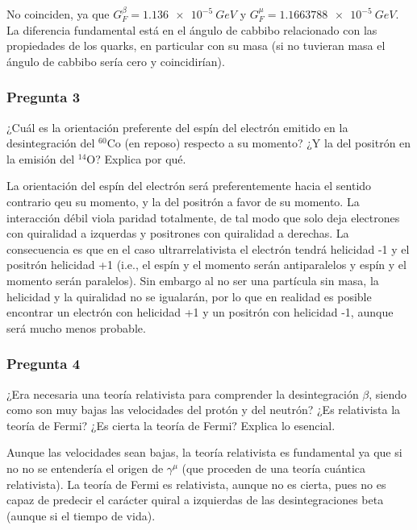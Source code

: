 No coinciden, ya que $G_F^\beta = \SI{1.136e-5}{GeV}$ y $G_F^\mu = \SI{1.1663788e-5}{GeV}$. La diferencia fundamental está en el ángulo de cabbibo relacionado con las propiedades de los quarks, en particular con su masa (si no tuvieran masa el ángulo de cabbibo sería cero y coincidirían).

\vspace*{2em}

\begin{Enunciado}
	\subsubsection*{Pregunta 3}

	¿Cuál es la orientación preferente del espín del electrón emitido en la desintegración del $^{60}$Co (en reposo) respecto a su momento? ¿Y la del positrón en la emisión del $^{14}$O? Explica por qué.

\end{Enunciado}

La orientación del espín del electrón será preferentemente hacia el sentido contrario qeu su momento, y la del positrón a favor de su momento. La interacción débil viola paridad totalmente, de tal modo que solo deja electrones con quiralidad a izquerdas y positrones con quiralidad a derechas. La consecuencia es que en el caso ultrarrelativista el electrón tendrá helicidad -1 y el positrón helicidad +1 (i.e., el espín y el momento serán antiparalelos y espín y el momento serán paralelos). Sin embargo al no ser una partícula sin masa, la helicidad y la quiralidad no se igualarán, por lo que en realidad es posible encontrar un electrón con helicidad +1 y un positrón con helicidad -1, aunque será mucho menos probable.

\vspace*{2em}

\begin{Enunciado}
	\subsubsection*{Pregunta 4}

	¿Era necesaria una teoría relativista para comprender la desintegración $\beta$, siendo como son muy bajas las velocidades del protón y del neutrón? ¿Es relativista la teoría de Fermi? ¿Es cierta la teoría de Fermi? Explica lo esencial.

\end{Enunciado}

Aunque las velocidades sean bajas, la teoría relativista es fundamental ya que si no no se entendería el origen de $\gamma^\mu$ (que proceden de una teoría cuántica relativista). La teoría de Fermi es relativista, aunque no es cierta, pues no es capaz de predecir el carácter quiral a izquierdas de las desintegraciones beta (aunque si el tiempo de vida).

